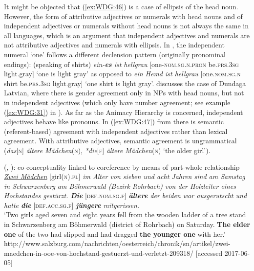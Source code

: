 \documentclass[output=collectionpaper]{langsci/langscibook}
\begin{document}
It might be objected that (\ref{ex:WDG:46}) is a case of ellipsis of the head noun. However, the form of attributive adjectives or numerals with head nouns and of independent adjectives or numerals without head nouns is not always the same in all languages, which is an argument that independent adjectives and numerals are not attributive adjectives and numerals with ellipsis. In , the independent numeral `one' follows a different declension pattern (originally pronominal endings): (speaking of shirts) \textit{ein-\textbf{es} ist hellgrau} [one-\textsc{nom.sg.n.pron} be.\textsc{prs.3sg} light.gray] `one is light gray' as opposed to \textit{ein Hemd ist hellgrau} [one.\textsc{nom.sg.n} shirt be.\textsc{prs.3sg} light.gray] `one shirt is light gray'. \cite{Waelchli2017} discusses the case of Dundaga Latvian, where there is gender agreement only in NPs with head nouns, but not in independent adjectives (which only have number agreement; see example (\ref{ex:WDG:31}) in ). As far as the Animacy Hierarchy is concerned, independent adjectives behave like pronouns. In (\ref{ex:WDG:47}) from  there is semantic (referent-based) agreement with independent adjectives rather than lexical agreement. With attributive adjectives, semantic agreement is ungrammatical (\textit{das}[\textsc{n}] \textit{ältere Mädchen}(\textsc{n}), \textit{*die}[\textsc{f}] \textit{ältere Mädchen}(\textsc{n}) `the older girl').

\ea\label{ex:WDG:47}
 (, ): co-conceptuality linked to coreference by means of part-whole relationship\\
\textit{\uline{Zwei Mädchen}} [girl\textsc{(n).pl}] \textit{im Alter von sieben und acht Jahren sind am Samstag in Schwarzenberg am Böhmerwald (Bezirk Rohrbach) von der Holzleiter eines Hochstandes gestürzt. \textbf{Die}} [\textsc{def.nom.sg.f}] \textit{\textbf{ältere} der beiden war ausgerutscht und hatte \textbf{die}} [\textsc{def.acc.sg.f}] \textit{\textbf{jüngere} mitgerissen.}\\
	`Two girls aged seven and eight years fell from the wooden ladder of a tree stand in Schwarzenberg am Böhmerwald (district of Rohrbach) on Saturday. \textbf{The elder one} of the two had slipped and had dragged \textbf{the younger one} with her.'\\
	http://www.salzburg.com/nachrichten/oesterreich/chronik/sn/artikel/zwei-maedchen-in-ooe-von-hochstand-gestuerzt-und-verletzt-209318/ [accessed 2017-06-05]\\
  \z
\end{document}
